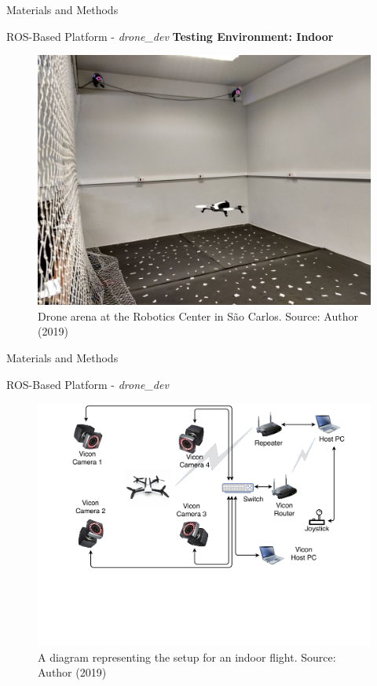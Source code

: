 
\begin{frame}{Materials and Methods}
\begin{block}{ROS-Based Platform - \textit{drone\_dev}}
	\textbf{Testing Environment: Indoor}	
	\begin{figure}[!h]
		\centering
		\includegraphics[scale=0.15]{img/viconRoom.jpeg}
		\caption{Drone arena at the Robotics Center in São Carlos. Source: Author (2019)}	\label{fig:viconRoom}
	\end{figure}
	
	
\end{block}
\end{frame}


\begin{frame}{Materials and Methods}
\begin{block}{ROS-Based Platform - \textit{drone\_dev}}
	\begin{figure}[!h]
		\centering
		\includegraphics[scale=0.35,trim={2.5cm 6cm 1.5cm 0},clip]{img/Diagram_ViconDroneDev.pdf}
		\caption{A diagram representing the setup for an indoor flight. Source: Author (2019)}\label{fig:ViconDiagram}
	\end{figure}
\end{block}
\end{frame}